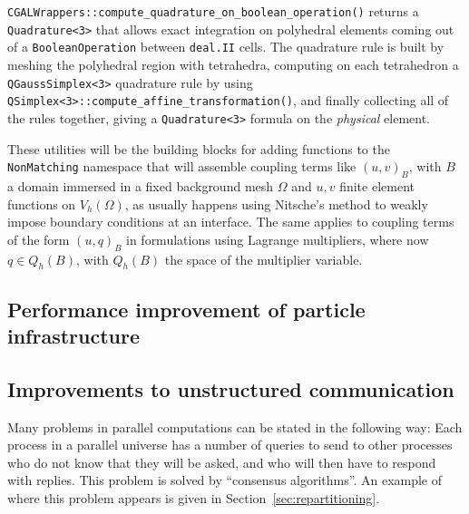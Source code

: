 \documentclass{ansarticle-preprint}
\newcommand{\specialword}[1]{\texttt{#1}}
\newcommand{\dealii}{{\specialword{deal.II}}\xspace}
\begin{document}
\texttt{CGALWrappers::compute\_quadrature\_on\_boolean\_operation()} returns a \texttt{Quadrature<3>} that allows exact integration on polyhedral elements coming out of a \texttt{BooleanOperation} between \dealii cells.
The quadrature rule is built by meshing the polyhedral region with tetrahedra, computing on each tetrahedron a \texttt{QGaussSimplex<3>} quadrature rule by using \texttt{QSimplex<3>::\allowbreak{}compute\_affine\_transformation()}, and finally
collecting all of the rules together, giving a \texttt{Quadrature<3>} formula on the \emph{physical} element.


These utilities will be the building blocks for adding functions to the \texttt{NonMatching} namespace that will assemble coupling terms like $(u,v)_{B}$, with $B$ a domain immersed in a fixed background mesh $\Omega$ and $u,v$ finite element functions on $V_h(\Omega)$, as usually happens using Nitsche's method to weakly impose boundary conditions at an interface. The same applies to coupling terms of the form $(u,q)_B$ in formulations using Lagrange multipliers, where now $q \in Q_h(B)$, with $Q_h(B)$ the space of the multiplier variable.


\subsection{Performance improvement of particle infrastructure}\label{sec:particles}



\subsection{Improvements to unstructured communication}
\label{sec:CA}

Many problems in parallel computations can be stated in the following
way: Each process in a parallel universe has a number of queries to
send to other processes who do not know that they will be asked, and
who will then have to respond with replies. This problem is solved by
``consensus algorithms''. An example of where this problem appears is
given in Section~\ref{sec:repartitioning}.
\end{document}
